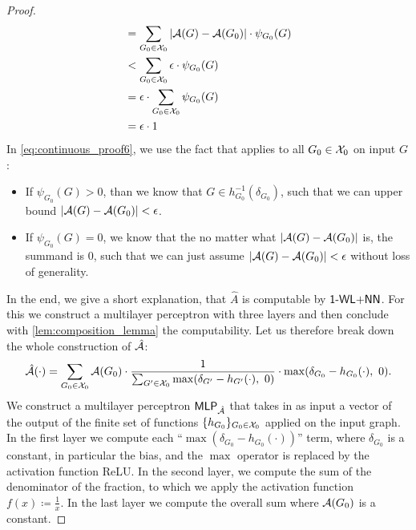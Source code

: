 \begin{proof}
\begin{align}
        &= \sum_{G_0 \in \mathcal{X}_0} |\mathcal{A}(G) - \mathcal{A}(G_0) | \cdot \psi_{G_0}(G)\nonumber\\
        &< \sum_{G_0 \in \mathcal{X}_0} \epsilon \cdot \psi_{G_0}(G)\label{eq:continuous_proof6}\\
        &= \epsilon \cdot \sum_{G_0 \in \mathcal{X}_0} \psi_{G_0}(G)\nonumber\\
        &= \epsilon \cdot 1 \nonumber
    \end{align}
    In \cref{eq:continuous_proof6}, we use the fact that applies to all $G_0 \in \mathcal{X}_0$ on input $G$:
    \begin{itemize}
        \item If $\psi_{G_0}(G) > 0$, than we know that $G \in 
        h_{G_0}^{-1}(\delta_{G_0})$, such that we can upper bound $|\mathcal{A}(G) - \mathcal{A}(G_0)| < \epsilon$.

        \item If $\psi_{G_0}(G) = 0$, we know that the no matter what $|\mathcal{A}(G) - \mathcal{A}(G_0)|$ is, the summand is $0$, such that we can just assume $|\mathcal{A}(G) - \mathcal{A}(G_0)| < \epsilon$ without loss of generality.
    \end{itemize}
    In the end, we give a short explanation, that $\hat{A}$ is computable by $\textsf{1-WL+NN}$. For this we construct a multilayer perceptron with three layers and then conclude with \cref{lem:composition_lemma} the computability. Let us therefore break down the whole construction of $\hat{\mathcal{A}}$:
    \begin{eqnarray*}
        \hat{\mathcal{A}}(\cdot) = \sum_{G_0 \in \mathcal{X}_0} \mathcal{A}(G_0) \cdot \frac{1}{\sum_{G' \in \mathcal{X}_0} \max(\delta_{G'} -  h_{G'}(\cdot), \ 0)} \cdot \max(\delta_{G_0} -  h_{G_0}(\cdot), \ 0).
    \end{eqnarray*}
    We construct a multilayer perceptron $\textsf{MLP}_{\hat{\mathcal{A}}}$ that takes in as input a vector of the output of the finite set of functions $\{ h_{G_0} \}_{G_0 \in \mathcal{X}_0}$ applied on the input graph. In the first layer we compute each ``$\max(\delta_{G_0} -  h_{G_0}(\cdot))$'' term, where $\delta_{G_0}$ is a constant, in particular the bias, and the $\max$ operator is replaced by the activation function ReLU. In the second layer, we compute the sum of the denominator of the fraction, to which we apply the activation function $f(x) \coloneqq \frac{1}{x}$. In the last layer we compute the overall sum where $\mathcal{A}(G_0)$ is a constant.
\end{proof}